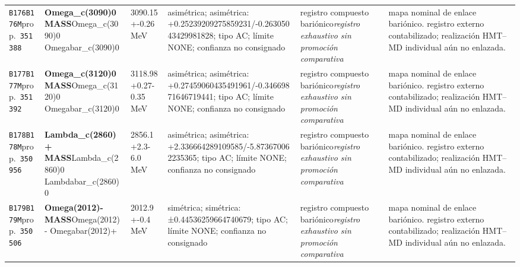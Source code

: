 \begin{landscape}
\begin{longtable}{L{1.85cm}L{4.45cm}L{2.35cm}L{4.05cm}L{3.35cm}L{7.15cm}}
\texttt{B176}\newline \texttt{B176M}\newline prop.\ \texttt{351388} & \textbf{Omega\_\allowbreak{}c(3090)0 MASS}\newline Omega\_\allowbreak{}c(3090)0 \textbar{}\allowbreak{} Omegabar\_\allowbreak{}c(3090)0 & 3090.15+-0.26\,MeV & asimétrica; asimétrica: +0.25239209275859231/-0.26305043429981828; tipo AC; límite NONE; confianza no consignado & registro compuesto bariónico\newline \emph{registro exhaustivo sin promoción comparativa} & mapa nominal de enlace bariónico. registro externo contabilizado; realización HMT--MD individual aún no enlazada. \\
\texttt{B177}\newline \texttt{B177M}\newline prop.\ \texttt{351392} & \textbf{Omega\_\allowbreak{}c(3120)0 MASS}\newline Omega\_\allowbreak{}c(3120)0 \textbar{}\allowbreak{} Omegabar\_\allowbreak{}c(3120)0 & 3118.98+0.27-0.35\,MeV & asimétrica; asimétrica: +0.27459060435491961/-0.34669871646719441; tipo AC; límite NONE; confianza no consignado & registro compuesto bariónico\newline \emph{registro exhaustivo sin promoción comparativa} & mapa nominal de enlace bariónico. registro externo contabilizado; realización HMT--MD individual aún no enlazada. \\
\texttt{B178}\newline \texttt{B178M}\newline prop.\ \texttt{350956} & \textbf{Lambda\_\allowbreak{}c(2860)+ MASS}\newline Lambda\_\allowbreak{}c(2860)0 \textbar{}\allowbreak{} Lambdabar\_\allowbreak{}c(2860)0 & 2856.1+2.3-6.0\,MeV & asimétrica; asimétrica: +2.336664289109585/-5.873670062235365; tipo AC; límite NONE; confianza no consignado & registro compuesto bariónico\newline \emph{registro exhaustivo sin promoción comparativa} & mapa nominal de enlace bariónico. registro externo contabilizado; realización HMT--MD individual aún no enlazada. \\
\texttt{B179}\newline \texttt{B179M}\newline prop.\ \texttt{350506} & \textbf{Omega(2012)- MASS}\newline Omega(2012)- \textbar{}\allowbreak{} Omegabar(2012)+ & 2012.9+-0.4\,MeV & simétrica; simétrica: ±0.44536259664740679; tipo AC; límite NONE; confianza no consignado & registro compuesto bariónico\newline \emph{registro exhaustivo sin promoción comparativa} & mapa nominal de enlace bariónico. registro externo contabilizado; realización HMT--MD individual aún no enlazada. \\

\end{longtable}
\end{landscape}
